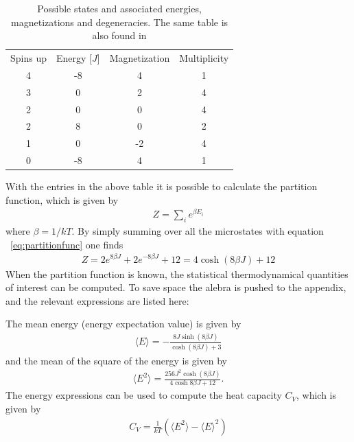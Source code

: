 \documentclass[aps,reprint]{revtex4-1}
\newcommand{\mean}[1]{\langle #1 \rangle}
\begin{document}
\begin{table}[H]
  \caption{Possible states and associated energies, magnetizations and degeneracies.
  The same table is also found in \cite{mortenjensen}}
  \label{tab:2x2values}
  \begin{ruledtabular}
    \begin{tabular}{cccc}
      Spins up & Energy [$J$] & Magnetization & Multiplicity \\
      4        & -8           & 4             & 1            \\
      3        & 0            & 2             & 4            \\
      2        & 0            & 0             & 4            \\
      2        & 8            & 0             & 2            \\
      1        & 0            & -2            & 4            \\
      0        & -8           & 4             & 1
    \end{tabular}
  \end{ruledtabular}
\end{table}
With the entries in the above table it is possible to calculate the partition
function, which is given by
\begin{align} \label{eq:partitionfunc}
  Z = \sum_i e^{\beta E_i}
\end{align}
where $\beta = 1/kT$. By simply summing over all the microstates with equation ~\ref{eq:partitionfunc}
one finds
\begin{align*}
  Z = 2 e^{8\beta J} + 2 e^{- 8\beta J} + 12 = 4 \cosh{(8\beta J)} + 12
\end{align*}
When the partition function is known, the statistical thermodynamical quantities
of interest can be computed. To save space the alebra is pushed to the appendix,
and the relevant expressions are listed here:

The mean energy (energy expectation value) is given by
\begin{align*}
  \mean{E} = -\frac{8 J \sinh{(8\beta J)}}{\cosh{(8\beta J)} + 3}
\end{align*}
and the mean of the square of the energy is given by
\begin{align*}
  \mean{E^2} = \frac{256 J^2 \cosh{(8\beta J)}}{4\cosh{8\beta J} + 12}.
\end{align*}
The energy expressions can be used to compute the heat capacity $C_V$, which
is given by
\begin{align*}
  C_V = \frac{1}{kT} \left( \mean{E^2} - \mean{E}^2 \right)
\end{align*}
\end{document}
